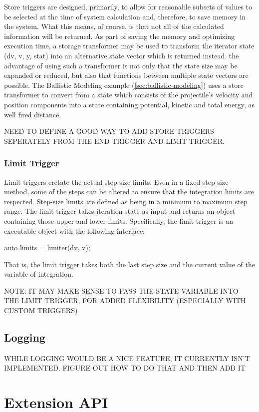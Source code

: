 \documentclass[letterpaper,10pt]{book}
\begin{document}
	Store triggers are designed, primarily, to allow for reasonable subsets of values to be selected at the time of system calculation and, therefore, to save memory in the system.  What this means, of course, is that not all of the calculated information will be returned.  As part of saving the memory and optimizing execution time, a storage transformer may be used to transform the iterator state (dv, v, y, stat) into an alternative state vector which is returned instead.  the advantage of using such a transformer is not only that the state size may be expanded or reduced, but also that functions between multiple state vectors are possible.  The Ballistic Modeling example (\ref{sec:ballistic-modeling}) uses a store transformer to convert from a state which consists of the projectile's velocity and position components into a state containing potential, kinetic and total energy, as well fired distance.
	
	NEED TO DEFINE A GOOD WAY TO ADD STORE TRIGGERS SEPERATELY FROM THE END TRIGGER AND LIMIT TRIGGER.

	
      \subsection{Limit Trigger}
	Limit triggers cretate the actual step-size limits.  Even in a fixed step-size method, some of the steps can be altered to ensure that the integration limits are respected. Step-size limits are defined as being in a minimum to maximum step range.  The limit trigger takes iteration state as input and returns an object containing those upper and lower limits.  Specifically, the limit trigger is an executable object with the following interface:
	\begin{epodecode}
	  auto limits = limiter(dv, v);
	\end{epodecode}
	That is, the limit trigger takes both the last step size and the current value of the variable of integration.
	
	NOTE: IT MAY MAKE SENSE TO PASS THE STATE VARIABLE INTO THE LIMIT TRIGGER, FOR ADDED FLEXIBILITY (ESPECIALLY WITH CUSTOM TRIGGERS)
	
    \section{Logging}
    WHILE LOGGING WOULD BE A NICE FEATURE, IT CURRENTLY ISN'T IMPLEMENTED.  FIGURE OUT HOW TO DO THAT AND THEN ADD IT

  \chapter{Extension API}
\end{document}
